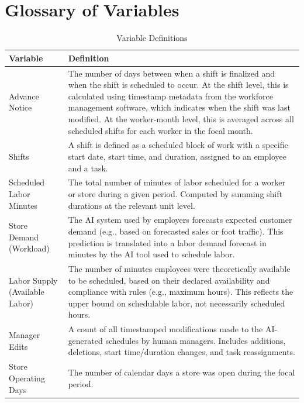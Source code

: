 \documentclass[letterpaper,11pt,leqno]{article}
\theoremstyle{paper}
\begin{document}
\section{Glossary of Variables} \label{sec:glossary_of_variables}

\begin{table}[H]
\scriptsize
\singlespacing
\centering
\caption{Variable Definitions}
\begin{tabular}{p{5cm}p{11cm}}
\toprule
\textbf{Variable} & \textbf{Definition} \\
\midrule
Advance Notice & The number of days between when a shift is finalized and when the shift is scheduled to occur. At the shift level, this is calculated using timestamp metadata from the workforce management software, which indicates when the shift was last modified. At the worker-month level, this is averaged across all scheduled shifts for each worker in the focal month. \\

Shifts & A shift is defined as a scheduled block of work with a specific start date, start time, and duration, assigned to an employee and a task.  \\

Scheduled Labor Minutes & The total number of minutes of labor scheduled for a worker or store during a given period. Computed by summing shift durations at the relevant unit level. \\

Store Demand (Workload) & The AI system used by employers forecasts expected customer demand (e.g., based on forecasted sales or foot traffic). This prediction is translated into a labor demand forecast in minutes by the AI tool used to schedule labor. \\[6pt]

Labor Supply (Available Labor) & The number of minutes employees were theoretically available to be scheduled, based on their declared availability and compliance with rules (e.g., maximum hours). This reflects the upper bound on schedulable labor, not necessarily scheduled hours. \\

Manager Edits & A count of all timestamped modifications made to the AI-generated schedules by human managers. Includes additions, deletions, start time/duration changes, and task reassignments. \\

Store Operating Days & The number of calendar days a store was open during the focal period. \\[6pt]


\end{tabular}
\end{table}
\end{document}
